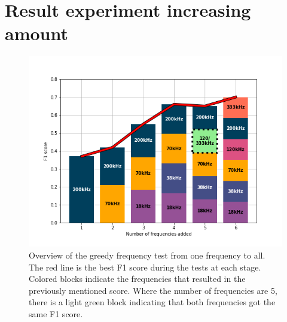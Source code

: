 \section{Result experiment increasing amount}
    \clearpage
    \begin{figure}[H]
        \centering
        \includegraphics[scale=0.8]{figures/legge_til_frekvenser.png}
        \caption{Overview of the greedy frequency test from one frequency to all. The red line is the best F1 score during the tests at each stage. Colored blocks indicate the frequencies that resulted in the previously mentioned score. Where the number of frequencies are 5, there is a light green block indicating that both frequencies got the same F1 score.}
      	\medskip 
        \label{dincrease_amount_fig}
    \end{figure}